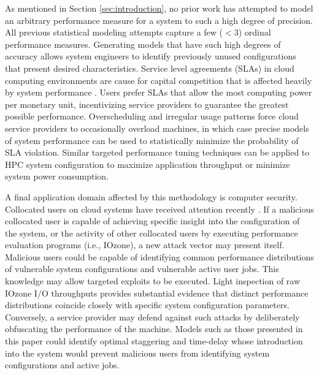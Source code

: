 \documentclass[smallextended]{svjour3}       %
\begin{document}
As mentioned in Section \ref{sec:introduction}, no prior work has attempted to model an arbitrary performance measure for a system to such a high degree of precision. All previous statistical modeling attempts capture a few ($<3$) ordinal performance measures. Generating models that have such high degrees of accuracy allows system engineers to identify previously unused configurations that present desired characteristics. Service level agreements (SLAs) in cloud computing environments are cause for capital competition that is affected heavily by system performance \cite{patel2009service}. Users prefer SLAs that allow the most computing power per monetary unit, incentivizing service providers to guarantee the greatest possible performance. Overscheduling and irregular usage patterns force cloud service providers to occasionally overload machines, in which case precise models of system performance can be used to statistically minimize the probability of SLA violation. Similar targeted performance tuning techniques can be applied to HPC system configuration to maximize application throughput or minimize system power consumption.

A final application domain affected by this methodology is computer security. Collocated users on cloud systems have received attention recently \cite{ali2015security}. If a malicious collocated user is capable of achieving specific insight into the configuration of the system, or the activity of other collocated users by executing performance evaluation programs (i.e., IOzone), a new attack vector may present itself. Malicious users could be capable of identifying common performance distributions of vulnerable system configurations and vulnerable active user jobs. This knowledge may allow targeted exploits to be executed. Light inspection of raw IOzone I/O throughputs provides substantial evidence that distinct performance distributions coincide closely with specific system configuration parameters. Conversely, a service provider may defend against such attacks by deliberately obfuscating the performance of the machine. Models such as those presented in this paper could identify optimal staggering and time-delay whose introduction into the system would prevent malicious users from identifying system configurations and active jobs.
\end{document}
